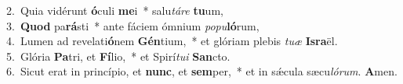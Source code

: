 {2.~}Quia vidérunt \textbf{ó}culi \textbf{me}i~* salu\textit{tá}\textit{re} \textbf{tu}um,\\
{3.~}\textbf{Quod} pa\textbf{rá}sti~* ante fáciem ómnium \textit{po}\textit{pu}\textbf{ló}rum,\\
{4.~}Lumen ad revelati\textbf{ó}nem \textbf{Gén}tium,~* et glóriam plebis \textit{tu}\textit{æ} \textbf{Is}\textbf{ra}ël.\\
{5.~}Glória \textbf{Pa}tri, et \textbf{Fí}lio,~* et Spirí\textit{tu}\textit{i} \textbf{San}cto.\\
{6.~}Sicut erat in princípio, et \textbf{nunc}, et \textbf{sem}per,~* et in sǽcula sæcu\textit{ló}\textit{rum}. \textbf{A}men.\\
